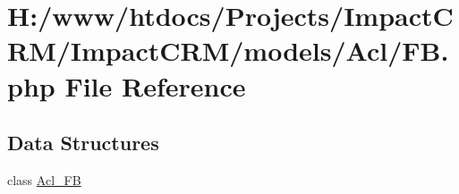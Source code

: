 \hypertarget{FB_8php}{
\section{H:/www/htdocs/Projects/ImpactCRM/ImpactCRM/models/Acl/FB.php File Reference}
\label{FB_8php}
}
\subsection*{Data Structures}
\begin{DoxyCompactItemize}
\item 
class \hyperlink{classAcl__FB}{Acl\_\-FB}
\end{DoxyCompactItemize}
